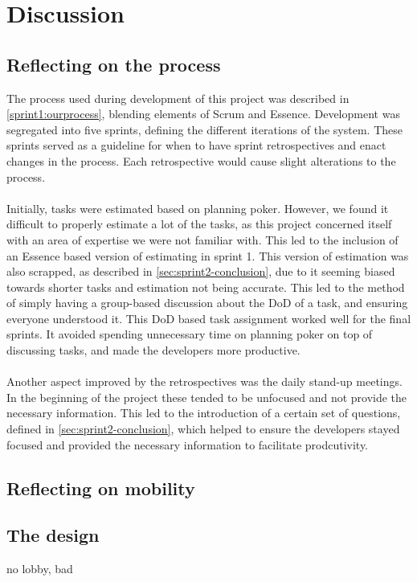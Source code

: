 \section{Discussion}

\subsection{Reflecting on the process}
The process used during development of this project was described in \autoref{sprint1:ourprocess}, blending elements of Scrum and Essence.
Development was segregated into five sprints, defining the different iterations of the system.
These sprints served as a guideline for when to have sprint retrospectives and enact changes in the process.
Each retrospective would cause slight alterations to the process.
\\\\
Initially, tasks were estimated based on planning poker.
However, we found it difficult to properly estimate a lot of the tasks, as this project concerned itself with an area of expertise we were not familiar with.
This led to the inclusion of an Essence based version of estimating in sprint 1.
This version of estimation was also scrapped, as described in \autoref{sec:sprint2-conclusion}, due to it seeming biased towards shorter tasks and estimation not being accurate.
This led to the method of simply having a group-based discussion about the DoD of a task, and ensuring everyone understood it.
This DoD based task assignment worked well for the final sprints.
It avoided spending unnecessary time on planning poker on top of discussing tasks, and made the developers more productive.
\\\\
Another aspect improved by the retrospectives was the daily stand-up meetings.
In the beginning of the project these tended to be unfocused and not provide the necessary information.
This led to the introduction of a certain set of questions, defined in \autoref{sec:sprint2-conclusion}, which helped to ensure the developers stayed focused and provided the necessary information to facilitate prodcutivity.



\subsection{Reflecting on mobility}

\subsection{The design}
no lobby, bad

